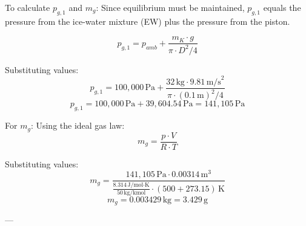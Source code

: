 To calculate \( p_{g,1} \) and \( m_g \):  
Since equilibrium must be maintained, \( p_{g,1} \) equals the pressure from the ice-water mixture (EW) plus the pressure from the piston.  

\[ p_{g,1} = p_{amb} + \frac{m_K \cdot g}{\pi \cdot D^2 / 4} \]  

Substituting values:  
\[ p_{g,1} = 100,000 \, \text{Pa} + \frac{32 \, \text{kg} \cdot 9.81 \, \text{m/s}^2}{\pi \cdot (0.1 \, \text{m})^2 / 4} \]  
\[ p_{g,1} = 100,000 \, \text{Pa} + 39,604.54 \, \text{Pa} = 141,105 \, \text{Pa} \]  

For \( m_g \):  
Using the ideal gas law:  
\[ m_g = \frac{p \cdot V}{R \cdot T} \]  

Substituting values:  
\[ m_g = \frac{141,105 \, \text{Pa} \cdot 0.00314 \, \text{m}^3}{\frac{8.314 \, \text{J/mol·K}}{50 \, \text{kg/kmol}} \cdot (500 + 273.15) \, \text{K}} \]  
\[ m_g = 0.003429 \, \text{kg} = 3.429 \, \text{g} \]  

---